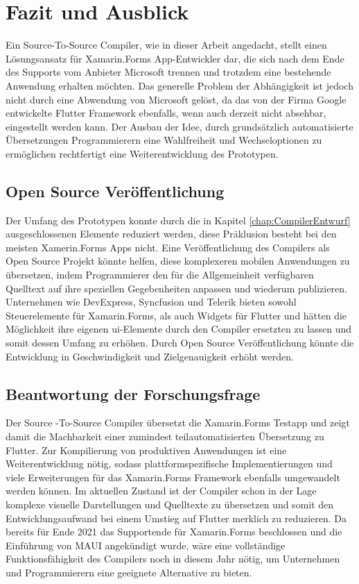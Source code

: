 \chapter{Fazit und Ausblick}
\label{chap:FazitAusblick}
Ein Source-To-Source Compiler,  wie in dieser Arbeit angedacht, stellt einen Lösungsansatz für Xamarin.Forms App-Entwickler dar,  die sich nach dem Ende des Supports vom Anbieter Microsoft trennen und trotzdem eine bestehende Anwendung erhalten möchten.  Das generelle Problem der Abhängigkeit ist jedoch nicht durch eine Abwendung von Microsoft gelöst, da das von der Firma Google entwickelte Flutter Framework ebenfalls, wenn auch derzeit nicht absehbar,  eingestellt werden kann. Der Ausbau der Idee,  durch grundsätzlich automatisierte Übersetzungen Programmierern eine Wahlfreiheit und Wechseloptionen zu ermöglichen rechtfertigt eine Weiterentwicklung des Prototypen.

\section{Open Source Veröffentlichung}

Der Umfang des Prototypen konnte durch die in Kapitel \ref{chap:CompilerEntwurf}  ausgeschlossenen Elemente 
reduziert werden, diese Präklusion besteht bei den meisten Xamerin.Forms Apps nicht. 
Eine Veröffentlichung des Compilers als Open Source Projekt könnte helfen, diese komplexeren 
mobilen Anwendungen zu übersetzen,  indem Programmierer den für die Allgemeinheit verfügbaren 
Quelltext auf ihre speziellen Gegebenheiten anpassen und wiederum publizieren.
Unternehmen wie DevExpress,  Syncfusion und Telerik bieten sowohl Steuerelemente für 
Xamarin.Forms, als auch Widgets für Flutter und hätten die Möglichkeit ihre eigenen \ac{ui}-Elemente 
durch den Compiler ersetzten zu lassen und somit dessen Umfang zu erhöhen.  
Durch Open Source Veröffentlichung könnte die Entwicklung in Geschwindigkeit und Zielgenauigkeit 
erhöht werden.

\section{Beantwortung der Forschungsfrage}
Der Source -To-Source Compiler übersetzt die Xamarin.Forms Testapp und zeigt damit die 
Machbarkeit einer zumindest teilautomatisierten Übersetzung zu Flutter.
Zur Kompilierung von produktiven Anwendungen ist eine Weiterentwicklung nötig, sodass 
plattformspezifische Implementierungen und viele Erweiterungen für das Xamarin.Forms Framework 
ebenfalls umgewandelt werden können.
Im aktuellen Zustand ist der Compiler schon in der Lage komplexe visuelle Darstellungen
und Quelltexte zu übersetzen und somit den Entwicklungsaufwand bei einem Umstieg auf Flutter 
merklich zu reduzieren.
Da bereits für Ende 2021 das Supportende für Xamarin.Forms beschlossen und die Einführung von 
MAUI angekündigt wurde, wäre eine vollständige Funktionsfähigkeit des Compilers noch in diesem 
Jahr nötig, um Unternehmen und Programmierern eine geeignete Alternative zu bieten. 

